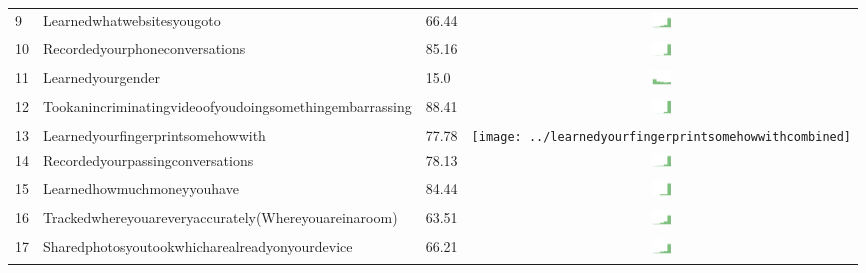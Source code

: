 \begin{table}[t]
\begin{center}
\begin{tabular}{| p{0.5cm} | p{7cm} | p{1cm} | c |}
9 & Learnedwhatwebsitesyougoto & 66.44 & \includegraphics[width = 0.5cm, height = 0.5cm]{../learnedwhatwebsitesyougotocombined} \\ 
10 & Recordedyourphoneconversations & 85.16 & \includegraphics[width = 0.5cm, height = 0.5cm]{../recordedyourphoneconversationscombined} \\ 
11 & Learnedyourgender & 15.0 & \includegraphics[width = 0.5cm, height = 0.5cm]{../learnedyourgendercombined} \\ 
12 & Tookanincriminatingvideoofyoudoingsomethingembarrassing & 88.41 & \includegraphics[width = 0.5cm, height = 0.5cm]{../tookanincriminatingvideoofyoudoingsomethingembarrassingcombined} \\ 
13 & Learnedyourfingerprintsomehowwith & 77.78 & \texttt{[image: ../learnedyourfingerprintsomehowwithcombined]} \\ 
14 & Recordedyourpassingconversations & 78.13 & \includegraphics[width = 0.5cm, height = 0.5cm]{../recordedyourpassingconversationscombined} \\ 
15 & Learnedhowmuchmoneyyouhave & 84.44 & \includegraphics[width = 0.5cm, height = 0.5cm]{../learnedhowmuchmoneyyouhavecombined} \\ 
16 & Trackedwhereyouareveryaccurately(Whereyouareinaroom) & 63.51 & \includegraphics[width = 0.5cm, height = 0.5cm]{../trackedwhereyouareveryaccurately(whereyouareinaroom)combined} \\ 
17 & Sharedphotosyoutookwhicharealreadyonyourdevice & 66.21 & \includegraphics[width = 0.5cm, height = 0.5cm]{../sharedphotosyoutookwhicharealreadyonyourdevicecombined} \\ 

\end{tabular}
\end{center}
\end{table}
